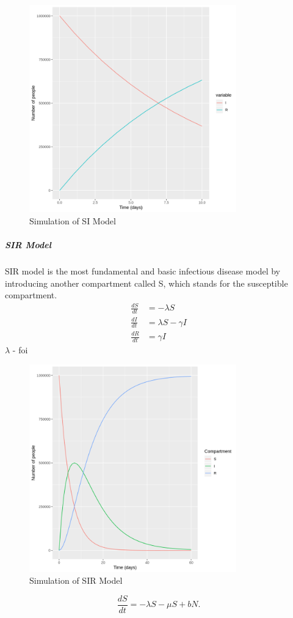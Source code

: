 \documentclass[a4paper, 12pt, twoside]{article}
\begin{document}
\begin{figure}[htpb]
	\centering
	\includegraphics[width=0.8\textwidth]{si-model}
	\caption{Simulation of SI Model}
	\label{fig:si-model}
\end{figure}

\subparagraph{SIR Model}
SIR model is the most fundamental and basic infectious disease model by introducing another compartment called S, which stands for the susceptible compartment.
\begin{align}
	\frac{dS}{dt} & = - \lambda S          \\
	\frac{dI}{dt} & = \lambda S - \gamma I \\
	\frac{dR}{dt} & = \gamma I
\end{align}
$\lambda$ -  \gls{foi}


\begin{figure}[htpb]
	\centering
	\includegraphics[width=0.8\textwidth]{sir-model}
	\caption{Simulation of SIR Model}
	\label{fig:sir-model}
\end{figure}
\[
	\frac{dS}{dt}=-\lambda S-\mu S+bN
	.\]
\end{document}
